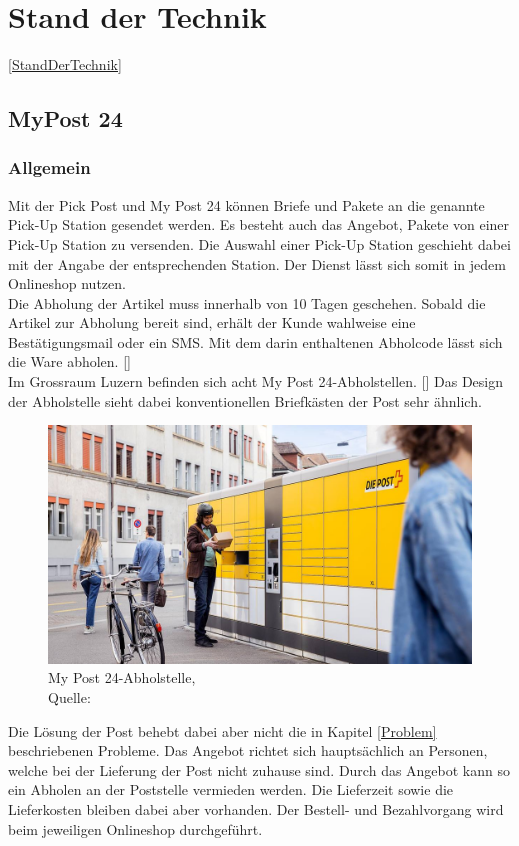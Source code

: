 \section{Stand der Technik}\ref{StandDerTechnik}
\subsection{MyPost 24}
\subsubsection{Allgemein}
Mit der Pick Post und My Post 24 können Briefe und Pakete an die genannte Pick-Up Station gesendet werden. Es besteht auch das Angebot, Pakete von einer Pick-Up Station zu versenden. 
Die Auswahl einer Pick-Up Station geschieht dabei mit der Angabe der entsprechenden Station. Der Dienst lässt sich somit in jedem Onlineshop nutzen.\\
Die Abholung der Artikel muss innerhalb von 10 Tagen geschehen. Sobald die Artikel zur Abholung bereit sind, erhält der Kunde wahlweise eine Bestätigungsmail oder ein SMS. Mit dem darin enthaltenen Abholcode lässt sich die Ware abholen. 
[\cite{postPickUp}]\\
Im Grossraum Luzern befinden sich acht My Post 24-Abholstellen. [\cite{myPost24Stations}]
Das Design der Abholstelle sieht dabei konventionellen Briefkästen der Post sehr ähnlich. 
\begin{figure}[H]
	\centering
	\includegraphics[width=1\textwidth]{images/myPostImage.jpg}
	\caption[My Post 24-Abholstelle]{My Post 24-Abholstelle,\\ Quelle: \cite{myPost24StationsImage}}
	\label{img: My Post 24-Abholstelle}
\end{figure}
Die Lösung der Post behebt dabei aber nicht die in Kapitel \ref{Problem} beschriebenen Probleme. Das Angebot richtet sich hauptsächlich an Personen, welche bei der Lieferung der Post nicht zuhause sind. Durch das Angebot kann so ein Abholen an der Poststelle vermieden werden. Die Lieferzeit sowie die Lieferkosten bleiben dabei aber vorhanden. Der Bestell- und Bezahlvorgang wird beim jeweiligen Onlineshop durchgeführt. 
\newpage 
